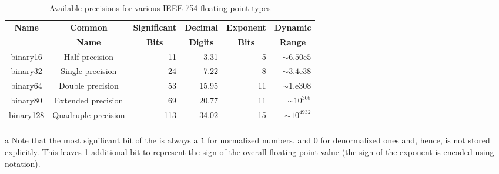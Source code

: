 \begin{table}[t]
\begin{center}
\vspace*{-3ex}
\begin{threeparttable}
\caption{Available precisions for various IEEE-754 floating-point types}\label{digitseparator-table3}\vspace{1.5ex}
{\small \begin{tabular}{c|c|c|c|c|c}\thickhline
\rowcolor[gray]{.9}   {\sffamily\bfseries Name} & {\sffamily\bfseries Common} &
{\sffamily\bfseries Significant } & {\sffamily\bfseries Decimal }& {\sffamily\bfseries Exponent } & {\sffamily\bfseries Dynamic}\\
\rowcolor[gray]{.9}    & {\sffamily\bfseries Name} &
{\sffamily\bfseries Bits\tnote{a}} & {\sffamily\bfseries Digits}& {\sffamily\bfseries Bits} & {\sffamily\bfseries Range}\\ \hline
binary16 & Half precision & \multicolumn{1}{r|}{11} & \multicolumn{1}{r|}{3.31} & \multicolumn{1}{r|}{5} & \multicolumn{1}{r}{$\sim6.50\text{e}5$}\\ \hline
binary32 & Single precision & \multicolumn{1}{r|}{24} & \multicolumn{1}{r|}{7.22} & \multicolumn{1}{r|}{8} & \multicolumn{1}{r}{$\sim3.4\text{e}38$}\\ \hline
binary64 & Double precision & \multicolumn{1}{r|}{53} & \multicolumn{1}{r|}{15.95} & \multicolumn{1}{r|}{11} & \multicolumn{1}{r}{$\sim1.\text{e}308$}\\ \hline
\rule{0pt}{3.5mm}binary80 & Extended precision & \multicolumn{1}{r|}{69} & \multicolumn{1}{r|}{20.77} & \multicolumn{1}{r|}{11} & \multicolumn{1}{r}{$\sim10^{308}$}\\ \hline
\rule{0pt}{3.5mm}binary128 & Quadruple precision & \multicolumn{1}{r|}{113} & \multicolumn{1}{r|}{34.02} & \multicolumn{1}{r|}{15} & \multicolumn{1}{r}{$\sim10^{4932}$}\\ 
\thickhline
\end{tabular}
} %
\begin{tablenotes}{\footnotesize
\item[a]{Note that the most significant bit of the 
is always a \lstinline!1! for normalized numbers, and 0 for denormalized ones and, hence, is not stored explicitly. This leaves 1
additional bit to represent the sign of the overall floating-point value
(the sign of the exponent is encoded using 
notation).}
} %
\end{tablenotes} %
\end{threeparttable}
\end{center}
\end{table}

